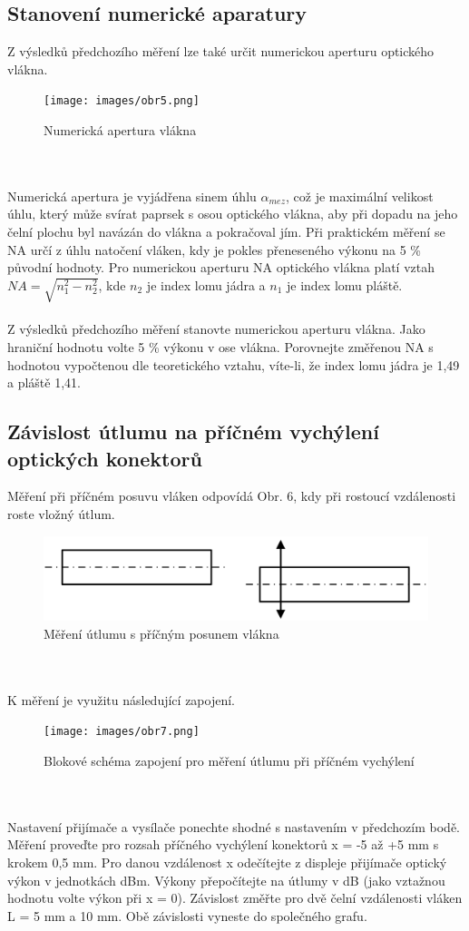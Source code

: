 \subsection{Stanovení numerické aparatury}
Z výsledků předchozího měření lze také určit numerickou aperturu optického vlákna.
\begin{figure}[h]
\centering
\texttt{[image: images/obr5.png]}
\caption{Numerická apertura vlákna}
\label{fig:5}
\end{figure}
\\\\
Numerická apertura je vyjádřena sinem úhlu $\alpha_{mez}$, což je maximální velikost úhlu, který může svírat paprsek s osou optického vlákna, aby při dopadu na jeho čelní plochu byl navázán do vlákna a pokračoval jím. Při praktickém měření se NA určí z úhlu natočení vláken, kdy je pokles přeneseného výkonu na 5 \% původní hodnoty. Pro numerickou aperturu NA optického vlákna platí vztah $NA = \sqrt{n_1^2 - n_2^2}$, kde $n_2$ je index lomu jádra a $n_1$ je index lomu pláště.
\\\\
Z výsledků předchozího měření stanovte numerickou aperturu vlákna. Jako hraniční hodnotu volte 5 \% výkonu v ose vlákna. Porovnejte změřenou NA s hodnotou vypočtenou dle teoretického vztahu, víte-li, že index lomu jádra je 1,49 a pláště 1,41.

\subsection{Závislost útlumu na příčném vychýlení optických konektorů}
Měření při příčném posuvu vláken odpovídá Obr. 6, kdy při rostoucí vzdálenosti roste vložný útlum.
\begin{figure}[ht]
\centering
\includegraphics[width=12cm]{images/obr6.png}
\caption{Měření útlumu s příčným posunem vlákna}
\label{fig:6}
\end{figure}
\\\\
K měření je využitu následující zapojení.
\begin{figure}[ht]
\centering
\texttt{[image: images/obr7.png]}
\caption{Blokové schéma zapojení pro měření útlumu při příčném vychýlení}
\label{fig:7}
\end{figure}
\\\\
Nastavení přijímače a vysílače ponechte shodné s nastavením v předchozím bodě. Měření proveďte pro rozsah příčného vychýlení konektorů x = -5 až +5 mm s krokem 0,5 mm. Pro danou vzdálenost x odečítejte z displeje přijímače optický výkon v jednotkách dBm. Výkony přepočítejte na útlumy v dB (jako vztažnou hodnotu volte výkon při x = 0). Závislost změřte pro dvě čelní vzdálenosti vláken L = 5 mm a 10 mm. Obě závislosti vyneste do společného grafu.

